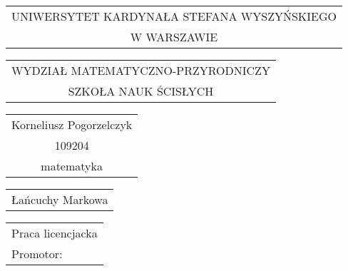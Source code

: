 \documentclass[final,a4paper,openany,12pt]{mwbk}
\begin{document}
\newtheorem{Tw}{Twierdzenie}
\newtheorem{Def}{Definicja}
\newtheorem{Prz}{Przykład}
\selectfont %

\begin{titlepage}
\vspace{-0.5cm}

\renewcommand{\arraystretch}{1.3} %

\begin{center}
{\footnotesize
\begin{tabular}{c}
UNIWERSYTET KARDYNAŁA STEFANA WYSZYŃSKIEGO\\
W WARSZAWIE\\
\end{tabular}
}
\vspace{2.5cm}

{\footnotesize
\begin{tabular}{c}
WYDZIAŁ MATEMATYCZNO-PRZYRODNICZY\\
SZKOŁA NAUK ŚCISŁYCH\\
\end{tabular}
}
\vspace{2.7cm}

\renewcommand{\arraystretch}{1.5} %

{\normalsize
\begin{tabular}{c}
Korneliusz Pogorzelczyk\\

109204\\

matematyka\\
\end{tabular}
}

\vspace{2.3cm}

{\large
\begin{tabular}{c}
Łańcuchy Markowa
\end{tabular}
}

\end{center}
\vspace{4cm}

\hspace{6cm}
\begin{tabular}{l}
Praca licencjacka\\

Promotor:\\


\end{tabular}
\end{titlepage}
\end{document}
